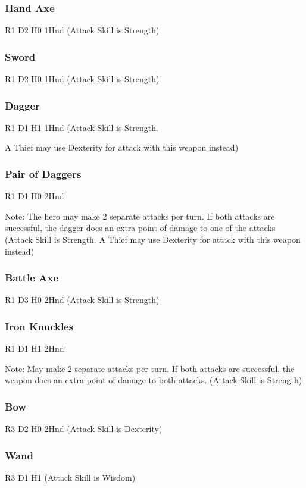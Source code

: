 \documentclass[a6paper,hidelinks]{article}
\begin{document}
\subsubsection{Hand Axe}
R1 D2 H0 1Hnd (Attack Skill is Strength)

\subsubsection{Sword}
R1 D2 H0 1Hnd (Attack Skill is Strength)

\subsubsection{Dagger}
R1 D1 H1 1Hnd (Attack Skill is Strength.

A Thief may use Dexterity for attack with this weapon instead)

\subsubsection{Pair of Daggers}
R1 D1 H0 2Hnd 

Note: The hero may make 2 separate attacks per turn. If both attacks are successful, the dagger does an extra point of damage to one of the attacks (Attack Skill is Strength. A Thief may use Dexterity for attack with this weapon instead)

\subsubsection{Battle Axe}
R1 D3 H0 2Hnd (Attack Skill is Strength)

\subsubsection{Iron Knuckles}
R1 D1 H1 2Hnd

Note: May make 2 separate attacks per turn. If both attacks are successful, the weapon does an extra point of damage to both attacks. (Attack Skill is Strength)

\subsubsection{Bow}
R3 D2 H0 2Hnd (Attack Skill is Dexterity)

\subsubsection{Wand}
R3 D1 H1 (Attack Skill is Wisdom)
\end{document}
